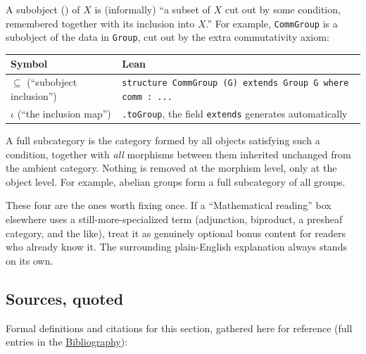 A subobject (\cite{MacLane1998}) of \(X\) is (informally) ``a subset of \(X\) cut out by some condition, remembered together with its inclusion into \(X\).'' For example, \texttt{CommGroup} is a subobject of the data in \texttt{Group}, cut out by the extra commutativity axiom:

\begin{center}

\end{center}

\begin{longtable}[]{@{}
  >{\raggedright\arraybackslash}p{}
  >{\raggedright\arraybackslash}p{}@{}}
\toprule\noalign{}
\begin{minipage}[b]{\linewidth}\raggedright
Symbol
\end{minipage} & \begin{minipage}[b]{\linewidth}\raggedright
Lean
\end{minipage} \\
\midrule\noalign{}
\endhead
\bottomrule\noalign{}
\endlastfoot
\(\subseteq\) (``subobject inclusion'') & \texttt{structure CommGroup (G) extends Group G where comm : ...} \\
\(\iota\) (``the inclusion map'') & \texttt{.toGroup}, the field \texttt{extends} generates automatically \\
\end{longtable}

A full subcategory is the category formed by all objects satisfying such a condition, together with \emph{all} morphisms between them inherited unchanged from the ambient category. Nothing is removed at the morphism level, only at the object level. For example, abelian groups form a full subcategory of all groups.

These four are the ones worth fixing once. If a ``Mathematical reading'' box elsewhere uses a still-more-specialized term (adjunction, biproduct, a presheaf category, and the like), treat it as genuinely optional bonus content for readers who already know it. The surrounding plain-English explanation always stands on its own.

\subsection{Sources, quoted}\label{sec:02-terminology-and-coc:01-terminology:11}

Formal definitions and citations for this section, gathered here for reference (full entries in the \hyperref[sec:root:bibliography:1]{Bibliography}):

